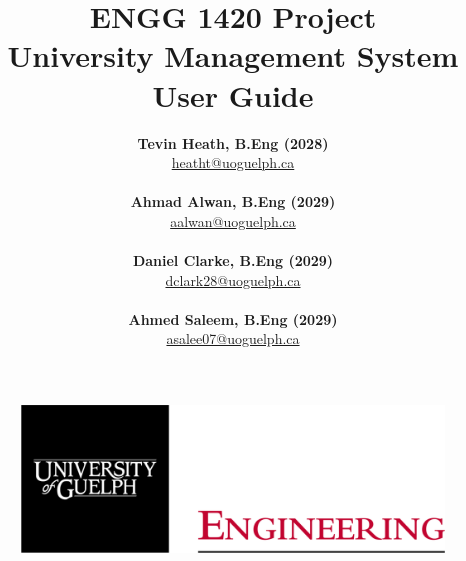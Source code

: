 \documentclass[12pt]{article}
\begin{document}
\title{\textbf{ENGG 1420 Project} \\ University Management System \\ User Guide} %
\author{\textbf{Tevin Heath, B.Eng (2028)}\\ \href{mailto:heatht@uoguelph.ca}{heatht@uoguelph.ca} \\\\  \textbf{Ahmad Alwan, B.Eng (2029)}\\ \href{mailto:aalwan@uoguelph.ca}{aalwan@uoguelph.ca} \\\\  \textbf{Daniel Clarke, B.Eng (2029)}\\\href{mailto:dclark28@uoguelph.ca}{dclark28@uoguelph.ca} \\\\  \textbf{Ahmed Saleem, B.Eng (2029)}\\ \href{mailto:asalee07@uoguelph.ca}{asalee07@uoguelph.ca} }
\maketitle %
\thispagestyle{empty}

\begin{figure}[H] %
    \centering
    \includegraphics[width=0.5\linewidth]{figures/SOE Lockup WEB - LARGE - transparent bkgd - RED ENG.png}
    \label{fig:enter-label}
\end{figure}

\vspace{2mm} %



\newpage
\tableofcontents


\end{document}
